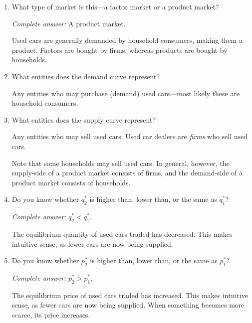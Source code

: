 \documentclass{assignment}
\begin{document}
\begin{enumerate}
\item What type of market is this---a factor market or a product market?

\begin{solution}
\emph{Complete answer:} A product market.

Used cars are generally demanded by household consumers, making them a product. Factors are bought by firms, whereas products are bought by households.
\end{solution}

\item What entities does the demand curve represent?

\begin{solution}
Any entities who may purchase (demand) used cars---most likely these are household consumers.
\end{solution}

\item What entities does the supply curve represent?

\begin{solution}
Any entities who may sell used cars. Used car dealers are \emph{firms} who sell used cars.

Note that some households may sell used cars. In general, however, the supply-side of a product market consists of firms, and the demand-side of a product market consists of households.
\end{solution}

\item Do you know whether $q^*_2$ is higher than, lower than, or the same as $q^*_1$?

\begin{solution}
\emph{Complete answer:} $q^*_2 < q^*_1$.

The equilibrium quantity of used cars traded has decreased. This makes intuitive sense, as fewer cars are now being supplied.
\end{solution}

\item Do you know whether $p^*_2$ is higher than, lower than, or the same as $p^*_1$?

\begin{solution}
\emph{Complete answer:} $p^*_2 > p^*_1$.

The equilibrium price of used cars traded has increased. This makes intuitive sense, as fewer cars are now being supplied. When something becomes more scarce, its price increases.
\end{solution}

\end{enumerate}
\end{document}
